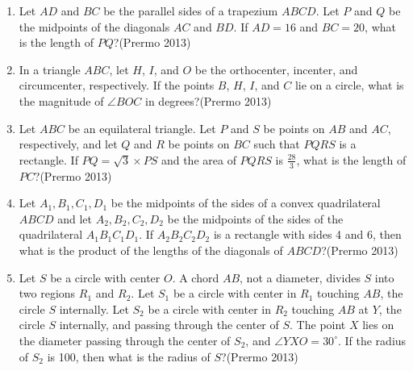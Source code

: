 \begin{enumerate}
\item Let $ AD $ and $ BC $ be the parallel sides of a trapezium $ ABCD $. Let $ P $ and $ Q $ be the midpoints of the diagonals $ AC $ and $ BD $. If $ AD = 16 $ and $ BC = 20 $, what is the length of $ PQ $?\hfill(Prermo 2013)

\item In a triangle $ ABC $, let $ H $, $ I $, and $ O $ be the orthocenter, incenter, and circumcenter, respectively. If the points $ B $, $ H $, $ I $, and $ C $ lie on a circle, what is the magnitude of $ \angle BOC $ in degrees?\hfill(Prermo 2013)

\item Let $ ABC $ be an equilateral triangle. Let $ P $ and $ S $ be points on $ AB $ and $ AC $, respectively, and let $ Q $ and $ R $ be points on $ BC $ such that $ PQRS $ is a rectangle. If $ PQ = \sqrt{3} \times PS $ and the area of $ PQRS $ is $ \frac{28}{3} $, what is the length of $ PC $?\hfill(Prermo 2013)

\item Let $ A_1, B_1, C_1, D_1 $ be the midpoints of the sides of a convex quadrilateral $ ABCD $ and let $ A_2, B_2, C_2, D_2 $ be the midpoints of the sides of the quadrilateral $ A_1B_1C_1D_1 $. If $ A_2B_2C_2D_2 $ is a rectangle with sides 4 and 6, then what is the product of the lengths of the diagonals of $ ABCD $?\hfill(Prermo 2013)

\item Let $ S $ be a circle with center $ O $. A chord $ AB $, not a diameter, divides $ S $ into two regions $ R_1 $ and $ R_2 $. Let $ S_1 $ be a circle with center in $ R_1 $ touching $ AB $, the circle $ S $ internally. Let $ S_2 $ be a circle with center in $ R_2 $ touching $ AB $ at $ Y $, the circle $ S $ internally, and passing through the center of $ S $. The point $ X $ lies on the diameter passing through the center of $ S_2 $, and $ \angle YXO = 30^\circ $. If the radius of $ S_2 $ is 100, then what is the radius of $ S $?\hfill(Prermo 2013)


\end{enumerate}
